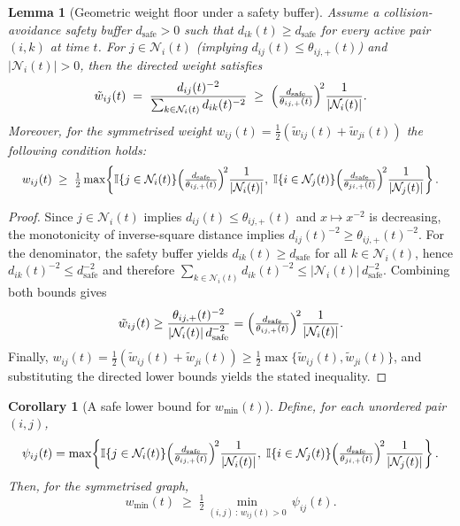 \documentclass[preprint,12pt]{elsarticle}
\theoremstyle{definition}\newtheorem{definition}{Definition}
\theoremstyle{plain}\newtheorem{theorem}{Theorem}
\theoremstyle{plain}\newtheorem{lemma}{Lemma}
\theoremstyle{plain}\newtheorem{corollary}{Corollary}
\theoremstyle{plain}\newtheorem{assumption}{Assumption}
\theoremstyle{remark}\newtheorem{remark}[theorem]{Remark}
\begin{document}
\begin{lemma}[Geometric weight floor under a safety buffer]
\label{lem:geom_floor}
Assume a collision-avoidance safety buffer $d_{\mathrm{safe}}>0$ such that
$d_{ik}(t)\ge d_{\mathrm{safe}}$ for every active pair $(i,k)$ at time $t$.
For $j\in\mathcal N_i(t)$ (implying $d_{ij}(t)\le \theta_{ij,+}(t)$) and 
$|\mathcal N_i(t)|>0$, then the directed weight satisfies
\[
  \tilde w_{ij}(t)
  \;=\;
  \frac{d_{ij}(t)^{-2}}{\sum_{k\in\mathcal N_i(t)} d_{ik}(t)^{-2}}
  \;\ge\;
  \Bigl(\tfrac{d_{\mathrm{safe}}}{\theta_{ij,+}(t)}\Bigr)^{\!2}
  \frac{1}{|\mathcal N_i(t)|}.
\]
Moreover, for the symmetrised weight $w_{ij}(t)=\tfrac12(\tilde w_{ij}(t)+\tilde w_{ji}(t))$ the following condition holds:
\[
  \resizebox{0.98\linewidth}{!}{$\displaystyle w_{ij}(t)\;\ge\;\tfrac12\max\!\left\{
    \mathbb{I}\{j\in\mathcal N_i(t)\}\Bigl(\tfrac{d_{\mathrm{safe}}}{\theta_{ij,+}(t)}\Bigr)^{\!2}\frac{1}{|\mathcal N_i(t)|},
    \;
    \mathbb{I}\{i\in\mathcal N_j(t)\}\Bigl(\tfrac{d_{\mathrm{safe}}}{\theta_{ji,+}(t)}\Bigr)^{\!2}\frac{1}{|\mathcal N_j(t)|}
  \right\}.$}
\]
\end{lemma}

\begin{proof}
Since $j\in\mathcal N_i(t)$ implies $d_{ij}(t)\le \theta_{ij,+}(t)$ and $x\mapsto x^{-2}$ is decreasing,
the monotonicity of inverse-square distance implies $d_{ij}(t)^{-2}\ge \theta_{ij,+}(t)^{-2}$.
For the denominator, the safety buffer yields $d_{ik}(t)\ge d_{\mathrm{safe}}$ for all $k\in\mathcal N_i(t)$,
hence $d_{ik}(t)^{-2}\le d_{\mathrm{safe}}^{-2}$ and therefore
$\sum_{k\in\mathcal N_i(t)} d_{ik}(t)^{-2}\le |\mathcal N_i(t)|\,d_{\mathrm{safe}}^{-2}$.
Combining both bounds gives
\[
\tilde w_{ij}(t)\ge
\frac{\theta_{ij,+}(t)^{-2}}{|\mathcal N_i(t)|\,d_{\mathrm{safe}}^{-2}}
=
\Bigl(\tfrac{d_{\mathrm{safe}}}{\theta_{ij,+}(t)}\Bigr)^{\!2}
\frac{1}{|\mathcal N_i(t)|}.
\]
Finally, $w_{ij}(t)=\tfrac12(\tilde w_{ij}(t)+\tilde w_{ji}(t))\ge \tfrac12\max\{\tilde w_{ij}(t),\tilde w_{ji}(t)\}$,
and substituting the directed lower bounds yields the stated inequality.
\end{proof}


\begin{corollary}[A safe lower bound for $w_{\min}(t)$]
\label{cor:wmin_floor}
Define, for each unordered pair $(i,j)$,
\[
  \resizebox{0.98\linewidth}{!}{$\displaystyle \psi_{ij}(t)=\max\!\left\{
    \mathbb{I}\{j\in\mathcal N_i(t)\}\Bigl(\tfrac{d_{\mathrm{safe}}}{\theta_{ij,+}(t)}\Bigr)^{\!2}\frac{1}{|\mathcal N_i(t)|},
    \;
    \mathbb{I}\{i\in\mathcal N_j(t)\}\Bigl(\tfrac{d_{\mathrm{safe}}}{\theta_{ji,+}(t)}\Bigr)^{\!2}\frac{1}{|\mathcal N_j(t)|}
  \right\}.$}
\]
Then, for the symmetrised graph,
\[
  w_{\min}(t)\;\ge\;\tfrac12\min_{(i,j)\,:\,w_{ij}(t)>0}\,\psi_{ij}(t).
\]
\end{corollary}
\end{document}
